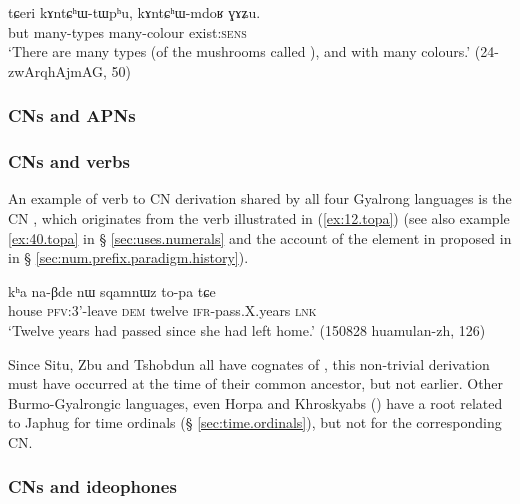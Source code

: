 \begin{exe}
\ex \label{ex:kAntChWmdoR}
 \gll  tɕeri kɤntɕʰɯ-tɯpʰu, kɤntɕʰɯ-mdoʁ ɣɤʑu. \\
 but many-types many-colour exist:\textsc{sens} \\
\glt  `There are many types (of the mushrooms called ), and with many colours.' (24-zwArqhAjmAG, 50)
\end{exe}

\subsubsection{CNs and APNs}   \label{sec:CN.APN}
\subsubsection{CNs and verbs}   \label{sec:CN.verbs}


An example of  verb to CN derivation shared by all four Gyalrong languages is the CN , which originates from the verb   illustrated in (\ref{ex:12.topa}) (see also example \ref{ex:40.topa}  in 
§ \ref {sec:uses.numerals} and the account of the  element in  proposed in in § \ref{sec:num.prefix.paradigm.history}). 

\begin{exe}
\ex \label{ex:12.topa} 
\gll kʰa na-βde nɯ sqamnɯz to-pa tɕe \\ 
house \textsc{pfv}:3'-leave \textsc{dem} twelve  \textsc{ifr}-pass.X.years \textsc{lnk} \\
\glt `Twelve years had passed since she had left home.' (150828 huamulan-zh, 126)
\end{exe}

Since Situ, Zbu and Tshobdun all have cognates of , this non-trivial derivation must have occurred at the time of their common ancestor, but not earlier. Other Burmo-Gyalrongic languages, even Horpa and Khroskyabs (\citealt{jacques17stau}) have a root related to Japhug  for time ordinals (§ \ref{sec:time.ordinals}), but not for the corresponding CN. 
 
\subsubsection{CNs and ideophones}   \label{sec:CN.ideophones}


